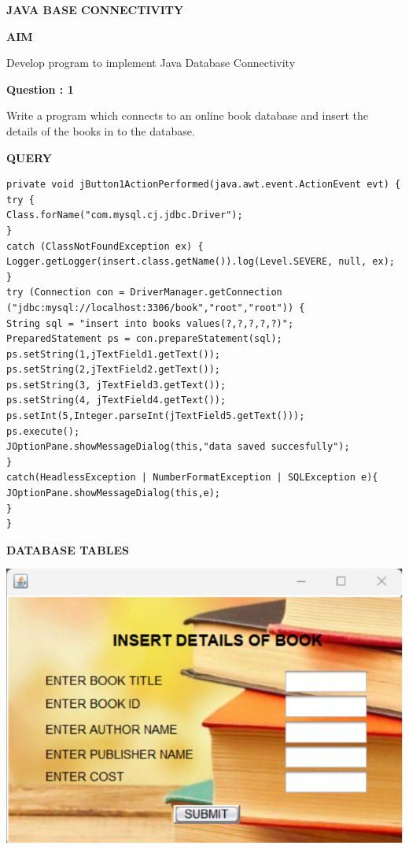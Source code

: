 \documentclass[a4paper,12pt]{report}
\begin{document}
\newpage
\begin{center}
\large\textbf{JAVA BASE CONNECTIVITY}
\end{center}

\begin{flushleft}
\textbf{AIM }
\end{flushleft}
Develop program to implement Java 
Database Connectivity

\begin{flushleft}
    \textbf{Question : 1}
\end{flushleft}
Write a program which connects to 
an online book database and insert 
the details of the books in to the 
database.
\begin{flushleft}
\textbf{QUERY }
\end{flushleft}
 \begin{verbatim}
private void jButton1ActionPerformed(java.awt.event.ActionEvent evt) {
try {
Class.forName("com.mysql.cj.jdbc.Driver");
}
catch (ClassNotFoundException ex) {
Logger.getLogger(insert.class.getName()).log(Level.SEVERE, null, ex);
}
try (Connection con = DriverManager.getConnection
("jdbc:mysql://localhost:3306/book","root","root")) {
String sql = "insert into books values(?,?,?,?,?)";
PreparedStatement ps = con.prepareStatement(sql);
ps.setString(1,jTextField1.getText());
ps.setString(2,jTextField2.getText());
ps.setString(3, jTextField3.getText());
ps.setString(4, jTextField4.getText());
ps.setInt(5,Integer.parseInt(jTextField5.getText()));
ps.execute();
JOptionPane.showMessageDialog(this,"data saved succesfully");
}
catch(HeadlessException | NumberFormatException | SQLException e){
JOptionPane.showMessageDialog(this,e);
}
}
\end{verbatim}
\begin{flushleft}
\textbf{DATABASE TABLES}
\end{flushleft}
\includegraphics[scale=0.4]{Connectivity1.png}
\end{document}
